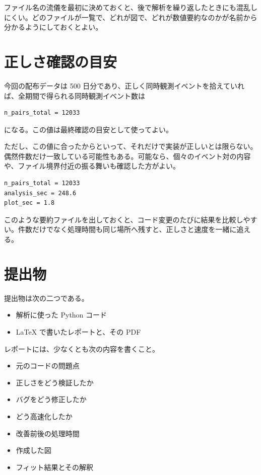 ファイル名の流儀を最初に決めておくと、後で解析を繰り返したときにも混乱しにくい。どのファイルが一覧で、どれが図で、どれが数値要約なのかが名前から分かるようにしておくとよい。

\section{正しさ確認の目安}

今回の配布データは 500 日分であり、正しく同時観測イベントを拾えていれば、全期間で得られる同時観測イベント数は

\begin{lstlisting}[numbers=none, xleftmargin=2\zw]
n_pairs_total = 12033
\end{lstlisting}

になる。この値は最終確認の目安として使ってよい。

ただし、この値に合ったからといって、それだけで実装が正しいとは限らない。偶然件数だけ一致している可能性もある。可能なら、個々のイベント対の内容や、ファイル境界付近の振る舞いも確認した方がよい。

\begin{lstlisting}[numbers=none, xleftmargin=2\zw, caption={summary.txt の例}]
n_pairs_total = 12033
analysis_sec = 248.6
plot_sec = 1.8
\end{lstlisting}

このような要約ファイルを出しておくと、コード変更のたびに結果を比較しやすい。件数だけでなく処理時間も同じ場所へ残すと、正しさと速度を一緒に追える。

\section{提出物}

提出物は次の二つである。

\begin{itemize}
\item 解析に使った Python コード
\item LaTeX で書いたレポートと、その PDF
\end{itemize}

レポートには、少なくとも次の内容を書くこと。

\begin{itemize}
\item 元のコードの問題点
\item 正しさをどう検証したか
\item バグをどう修正したか
\item どう高速化したか
\item 改善前後の処理時間
\item 作成した図
\item フィット結果とその解釈
\end{itemize}

